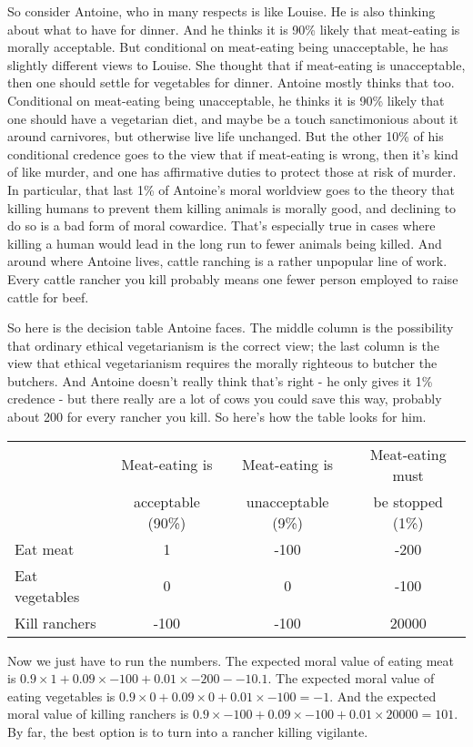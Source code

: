 \documentclass[11pt,]{book}
\def\toprule{}
\def\bottomrule{}
\begin{document}
So consider Antoine, who in many respects is like Louise. He is also thinking about what to have for dinner. And he thinks it is 90\% likely that meat-eating is morally acceptable. But conditional on meat-eating being unacceptable, he has slightly different views to Louise. She thought that if meat-eating is unacceptable, then one should settle for vegetables for dinner. Antoine mostly thinks that too. Conditional on meat-eating being unacceptable, he thinks it is 90\% likely that one should have a vegetarian diet, and maybe be a touch sanctimonious about it around carnivores, but otherwise live life unchanged. But the other 10\% of his conditional credence goes to the view that if meat-eating is wrong, then it's kind of like murder, and one has affirmative duties to protect those at risk of murder. In particular, that last 1\% of Antoine's moral worldview goes to the theory that killing humans to prevent them killing animals is morally good, and declining to do so is a bad form of moral cowardice. That's especially true in cases where killing a human would lead in the long run to fewer animals being killed. And around where Antoine lives, cattle ranching is a rather unpopular line of work. Every cattle rancher you kill probably means one fewer person employed to raise cattle for beef.

So here is the decision table Antoine faces. The middle column is the possibility that ordinary ethical vegetarianism is the correct view; the last column is the view that ethical vegetarianism requires the morally righteous to butcher the butchers. And Antoine doesn't really think that's right - he only gives it 1\% credence - but there really are a lot of cows you could save this way, probably about 200 for every rancher you kill. So here's how the table looks for him.

\begin{longtable}[]{@{}lccc@{}}
\toprule
\endhead
& Meat-eating is & Meat-eating is & Meat-eating must\tabularnewline
& acceptable (90\%) & unacceptable (9\%) & be stopped (1\%)\tabularnewline
Eat meat & 1 & -100 & -200\tabularnewline
Eat vegetables & 0 & 0 & -100\tabularnewline
Kill ranchers & -100 & -100 & 20000\tabularnewline
\bottomrule
\end{longtable}

Now we just have to run the numbers. The expected moral value of eating meat is \(0.9 \times 1 + 0.09 \times -100 + 0.01 \times -200 - -10.1\). The expected moral value of eating vegetables is \(0.9 \times 0 + 0.09 \times 0 + 0.01 \times -100 = -1\). And the expected moral value of killing ranchers is \(0.9 \times -100 + 0.09 \times -100 + 0.01 \times 20000 = 101\). By far, the best option is to turn into a rancher killing vigilante.
\end{document}
